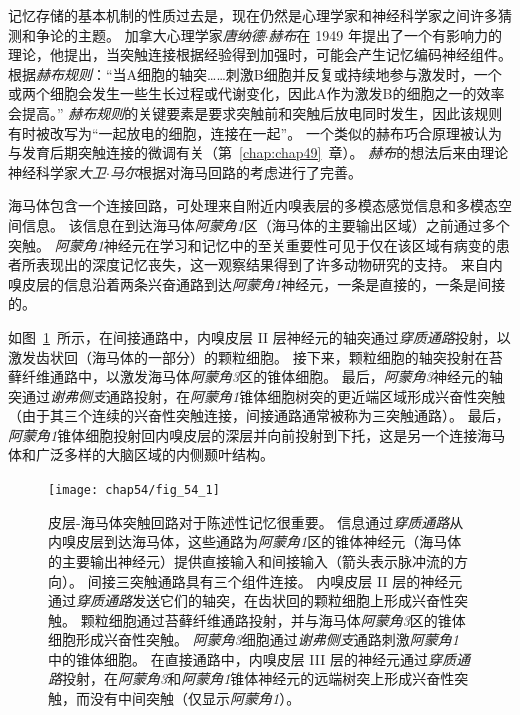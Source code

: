 记忆存储的基本机制的性质过去是，现在仍然是心理学家和神经科学家之间许多猜测和争论的主题。
加拿大心理学家\textit{唐纳德$\cdot$赫布}在 1949 年提出了一个有影响力的理论，他提出，当突触连接根据经验得到加强时，可能会产生记忆编码神经组件。
根据\textit{赫布规则}：“当A细胞的轴突……刺激B细胞并反复或持续地参与激发时，一个或两个细胞会发生一些生长过程或代谢变化，因此A作为激发B的细胞之一的效率会提高。”
\textit{赫布规则}的关键要素是要求突触前和突触后放电同时发生，因此该规则有时被改写为“一起放电的细胞，连接在一起”。
一个类似的赫布巧合原理被认为与发育后期突触连接的微调有关（第~\ref{chap:chap49}~章）。
\textit{赫布}的想法后来由理论神经科学家\textit{大卫$\cdot$马尔}根据对海马回路的考虑进行了完善。


海马体包含一个连接回路，可处理来自附近内嗅表层的多模态感觉信息和多模态空间信息。
该信息在到达海马体\textit{阿蒙角1}区（海马体的主要输出区域）之前通过多个突触。
\textit{阿蒙角1}神经元在学习和记忆中的至关重要性可见于仅在该区域有病变的患者所表现出的深度记忆丧失，这一观察结果得到了许多动物研究的支持。
来自内嗅皮层的信息沿着两条兴奋通路到达\textit{阿蒙角1}神经元，一条是直接的，一条是间接的。


如图~\ref{fig:54_1}~所示，在间接通路中，内嗅皮层 II 层神经元的轴突通过\textit{穿质通路}投射，以激发齿状回（海马体的一部分）的颗粒细胞。
接下来，颗粒细胞的轴突投射在苔藓纤维通路中，以激发海马体\textit{阿蒙角3}区的锥体细胞。
最后，\textit{阿蒙角3}神经元的轴突通过\textit{谢弗侧支}通路投射，在\textit{阿蒙角1}锥体细胞树突的更近端区域形成兴奋性突触（由于其三个连续的兴奋性突触连接，间接通路通常被称为三突触通路）。
最后，\textit{阿蒙角1}锥体细胞投射回内嗅皮层的深层并向前投射到下托，这是另一个连接海马体和广泛多样的大脑区域的内侧颞叶结构。


\begin{figure}[htbp]
	\centering
	\texttt{[image: chap54/fig\_54\_1]}
	\caption{皮层-海马体突触回路对于陈述性记忆很重要。
		信息通过\textit{穿质通路}从内嗅皮层到达海马体，这些通路为\textit{阿蒙角1}区的锥体神经元（海马体的主要输出神经元）提供直接输入和间接输入（箭头表示脉冲流的方向）。
		间接三突触通路具有三个组件连接。
		内嗅皮层 II 层的神经元通过\textit{穿质通路}发送它们的轴突，在齿状回的颗粒细胞上形成兴奋性突触。
		颗粒细胞通过苔藓纤维通路投射，并与海马体\textit{阿蒙角3}区的锥体细胞形成兴奋性突触。
		\textit{阿蒙角3}细胞通过\textit{谢弗侧支}通路刺激\textit{阿蒙角1}中的锥体细胞。
		在直接通路中，内嗅皮层 III 层的神经元通过\textit{穿质通路}投射，在\textit{阿蒙角3}和\textit{阿蒙角1}锥体神经元的远端树突上形成兴奋性突触，而没有中间突触（仅显示\textit{阿蒙角1}）。}
	\label{fig:54_1}
\end{figure}



